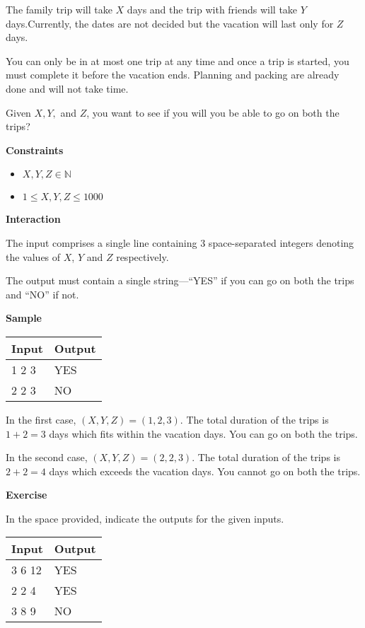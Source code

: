 \documentclass[a4paper]{exam}
\newcommand\heading[1]{\textbf{#1}}
\newcommand\inn{\in \mathbb{N}}
\begin{document}
\begin{questions}
    The family trip will take $X$ days and the trip with friends will take $Y$ days.Currently, the dates are not decided but the vacation will last only for $Z$ days.

    You can only be in at most one trip at any time and once a trip is started, you must complete it before the vacation ends. Planning and packing are already done and will not take time.

    Given $X,Y,$ and $Z$, you want to see if you will you be able to go on both the trips?

    \heading{Constraints}
    \begin{itemize}
        \item  $X,Y,Z\inn$
        \item  $1\le X,Y,Z\le1000$
    \end{itemize}


    \heading{Interaction}

    The input comprises a single line containing 3 space-separated integers denoting the values of $X$, $Y$ and $Z$ respectively.

    The output must contain a single string---``YES'' if you can go on both the trips and ``NO'' if not.

    \heading{Sample}

    \begin{tabularx}{\textwidth}{|X|X|}
        \rowcolor{gray!50}
        \hline
        Input & Output \\ \hline\hline
        1 2 3 & YES    \\\hline
        2 2 3 & NO     \\\hline
    \end{tabularx}

    In the first case, $(X,Y,Z) = (1,2,3)$. The total duration of the trips is $1+2=3$ days which fits within the vacation days. You can go on both the trips.

    In the second case, $(X,Y,Z) = (2,2,3)$. The total duration of the trips is $2+2=4$ days which exceeds the vacation days. You cannot go on both the trips.

    \heading{Exercise}

    In the space provided, indicate the outputs for the given inputs.

    \begin{tabularx}{\textwidth}{|X|X|}
        \rowcolor{gray!50}
        \hline
        Input  & Output \\ \hline\hline
        3 6 12 & YES    \\\hline
        2 2 4  & YES    \\\hline
        3 8 9  & NO     \\\hline
    \end{tabularx}


\end{questions}
\end{document}
